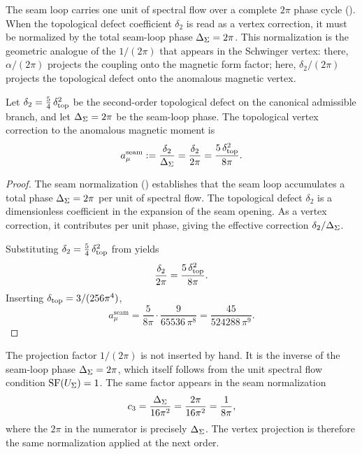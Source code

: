 The seam loop carries one unit of spectral flow over a complete $2\pi$ phase
cycle (). When the topological defect coefficient
$\delta_2$ is read as a vertex correction, it must be normalized by the total
seam-loop phase $\Delta_\Sigma=2\pi$. This normalization is the geometric
analogue of the $1/(2\pi)$ that appears in the Schwinger vertex: there,
$\alpha/(2\pi)$ projects the coupling onto the magnetic form factor; here,
$\delta_2/(2\pi)$ projects the topological defect onto the anomalous
magnetic vertex.

\begin{theorem}\label{thm:seam-vertex}
Let $\delta_2=\frac54\,\delta_{\mathrm{top}}^2$ be the second-order topological defect on
the canonical admissible branch, and let $\Delta_\Sigma=2\pi$ be the seam-loop
phase. The topological vertex correction to the anomalous magnetic moment is
\begin{equation}\label{eq:seam-vertex}
a_\mu^{\mathrm{seam}}
:=
\frac{\delta_2}{\Delta_\Sigma}
=
\frac{\delta_2}{2\pi}
=
\frac{5\,\delta_{\mathrm{top}}^2}{8\pi}.
\end{equation}
\end{theorem}

\begin{proof}
The seam normalization () establishes that the
seam loop accumulates a total phase $\Delta_\Sigma=2\pi$ per unit of spectral
flow. The topological defect $\delta_2$ is a dimensionless coefficient in the
expansion of the seam opening. As a vertex correction, it contributes per unit
phase, giving the effective correction $\delta_2/\Delta_\Sigma$.

Substituting $\delta_2=\frac54\,\delta_{\mathrm{top}}^2$ from
 yields
\[
\frac{\delta_2}{2\pi}
=
\frac{5\,\delta_{\mathrm{top}}^2}{8\pi}.
\]
Inserting $\delta_{\mathrm{top}}=3/(256\pi^4)$,
\[
a_\mu^{\mathrm{seam}}
=
\frac{5}{8\pi}
\cdot
\frac{9}{65536\,\pi^8}
=
\frac{45}{524288\,\pi^9}.
\]
\end{proof}

\begin{remark}
The projection factor $1/(2\pi)$ is not inserted by hand. It is the inverse
of the seam-loop phase $\Delta_\Sigma=2\pi$, which itself follows from the
unit spectral flow condition $\operatorname{SF}(U_\Sigma)=1$. The same factor appears in the
seam normalization
\[
c_3=\frac{\Delta_\Sigma}{16\pi^2}=\frac{2\pi}{16\pi^2}=\frac{1}{8\pi},
\]
where the $2\pi$ in the numerator is precisely $\Delta_\Sigma$. The vertex
projection is therefore the same normalization applied at the next order.
\end{remark}

